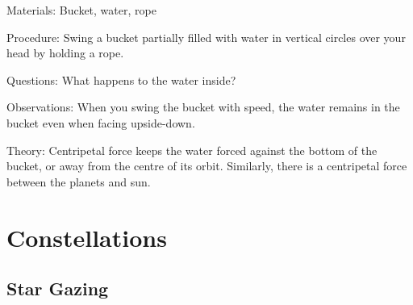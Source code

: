 \begin{multicols}{2}
\begin{description*}
\item[Materials:]{Bucket, water, rope}
\item[Procedure:]{Swing a bucket partially filled with water in vertical circles over your head by holding a rope.}
\item[Questions:]{What happens to the water inside?}
\item[Observations:]{When you swing the bucket with speed, the water remains in the bucket even when facing upside-down.}
\item[Theory:]{Centripetal force keeps the water forced against the bottom of the bucket, or away from the centre of its orbit. Similarly, there is a centripetal force between the planets and sun.}
\end{description*}


\section*{Constellations} 


\subsection{Star Gazing}



\end{multicols}
